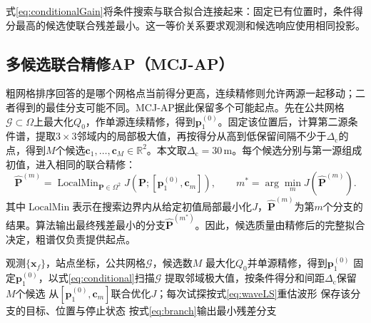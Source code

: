 \documentclass[a4paper,fleqn]{cas-sc}
\numberwithin{equation}{section}
\numberwithin{figure}{section}
\numberwithin{table}{section}
\newcommand{\R}{\mathbb R}
\begin{document}
式\eqref{eq:conditionalGain}将条件搜索与联合拟合连接起来：固定已有位置时，条件得分最高的候选使联合残差最小\cite{ChenHudsonYao2002}。这一等价关系要求观测和候选响应使用相同投影。

\subsection{多候选联合精修AP（MCJ-AP）}\label{sec:mcj}
粗网格排序回答的是哪个网格点当前得分更高，连续精修则允许两源一起移动；二者得到的最佳分支可能不同。MCJ-AP据此保留多个可能起点。先在公共网格$\mathcal G\subset\Omega$上最大化$Q_0$，作单源连续精修，得到$\bm p_1^{(0)}$。固定该位置后，计算第二源条件谱，提取$3\times3$邻域内的局部极大值，再按得分从高到低保留间隔不少于$\Delta_{\mathrm c}$的点，得到$M$个候选$\bm c_1,\ldots,\bm c_M\in\R^2$。本文取$\Delta_{\mathrm c}=30$\,m。每个候选分别与第一源组成初值，进入相同的联合精修：
\begin{equation}
 \widehat{\bm P}^{(m)}=\operatorname{LocalMin}_{\bm P\in\Omega^2}
 J(\bm P;[\bm p_1^{(0)},\bm c_m]),\qquad
 m^*=\arg\min_m J(\widehat{\bm P}^{(m)}).\label{eq:branch}
\end{equation}
其中$\operatorname{LocalMin}$表示在搜索边界内从给定初值局部最小化$J$，$\widehat{\bm P}^{(m)}$为第$m$个分支的结果。算法输出最终残差最小的分支$\widehat{\bm P}^{(m^*)}$。因此，候选质量由精修后的完整拟合决定，粗谱仅负责提供起点。

\begin{algorithm}[H]
\caption{多候选联合精修AP}\label{alg:ap}
\begin{algorithmic}[1]
\Require 观测$\{\bm x_f\}$，站点坐标，公共网格$\mathcal G$，候选数$M$
\State 最大化$Q_0$并单源精修，得到$\bm p_1^{(0)}$
\State 固定$\bm p_1^{(0)}$，以式\eqref{eq:conditional}扫描$\mathcal G$
\State 提取邻域极大值，按条件得分和间距$\Delta_{\mathrm c}$保留$M$个候选
  \State 从$[\bm p_1^{(0)},\bm c_m]$联合优化$J$；每次试探按式\eqref{eq:waveLS}重估波形
  \State 保存该分支的目标、位置与停止状态
\EndFor
\State 按式\eqref{eq:branch}输出最小残差分支
\end{algorithmic}
\end{algorithm}
\end{document}
